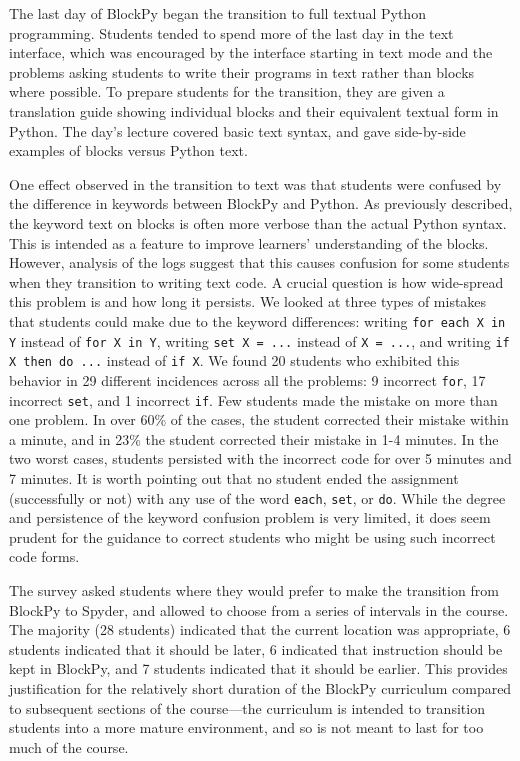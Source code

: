 \documentclass[10pt,journal,compsoc]{IEEEtran}
\begin{document}
The last day of BlockPy began the transition to full textual Python programming.
Students tended to spend more of the last day in the text interface, which was encouraged by the interface starting in text mode and the problems asking students to write their programs in text rather than blocks where possible.
To prepare students for the transition, they are given a translation guide showing individual blocks and their equivalent textual form in Python.
The day's lecture covered basic text syntax, and gave side-by-side examples of blocks versus Python text.

One effect observed in the transition to text was that students were confused by the difference in keywords between BlockPy and Python.
As previously described, the keyword text on blocks is often more verbose than the actual Python syntax.
This is intended as a feature to improve learners' understanding of the blocks.
However, analysis of the logs suggest that this causes confusion for some students when they transition to writing text code.
A crucial question is how wide-spread this problem is and how long it persists.
We looked at three types of mistakes that students could make due to the keyword differences: writing \texttt{for each X in Y} instead of \texttt{for X in Y}, writing \texttt{set X = ...} instead of \texttt{X = ...}, and writing \texttt{if X then do ...} instead of \texttt{if X}.
We found 20 students who exhibited this behavior in 29 different incidences across all the problems: 9 incorrect \texttt{for}, 17 incorrect \texttt{set}, and 1 incorrect \texttt{if}.
Few students made the mistake on more than one problem.
In over 60\% of the cases, the student corrected their mistake within a minute, and in 23\% the student corrected their mistake in 1-4 minutes.
In the two worst cases, students persisted with the incorrect code for over 5 minutes and 7 minutes.
It is worth pointing out that no student ended the assignment (successfully or not) with any use of the word \texttt{each}, \texttt{set}, or \texttt{do}.
While the degree and persistence of the keyword confusion problem is very limited, it does seem prudent for the guidance to correct students who might be using such incorrect code forms.

The survey asked students where they would prefer to make the transition from BlockPy to Spyder, and allowed to choose from a series of intervals in the course.
The majority (28 students) indicated that the current location was appropriate, 6 students indicated that it should be later, 6 indicated that instruction should be kept in BlockPy, and 7 students indicated that it should be earlier.
This provides justification for the relatively short duration of the BlockPy curriculum compared to subsequent sections of the course---the curriculum is intended to transition students into a more mature environment, and so is not meant to last for too much of the course.
\end{document}
